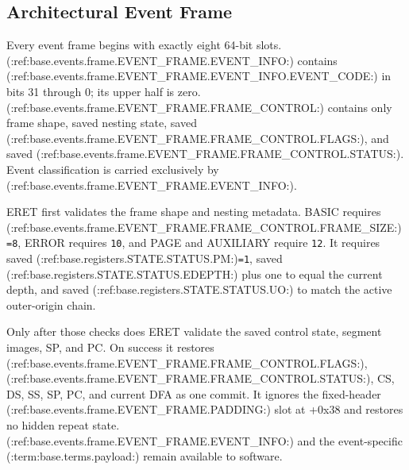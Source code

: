 \subsection{Architectural Event Frame}
Every event frame begins with exactly eight 64-bit slots. (:ref:base.events.frame.EVENT_FRAME.EVENT_INFO:) contains (:ref:base.events.frame.EVENT_FRAME.EVENT_INFO.EVENT_CODE:) in bits 31 through 0;
its upper half is zero. (:ref:base.events.frame.EVENT_FRAME.FRAME_CONTROL:) contains only frame shape, saved nesting state, saved (:ref:base.events.frame.EVENT_FRAME.FRAME_CONTROL.FLAGS:), and saved (:ref:base.events.frame.EVENT_FRAME.FRAME_CONTROL.STATUS:).
Event classification is carried exclusively by (:ref:base.events.frame.EVENT_FRAME.EVENT_INFO:).









ERET first validates the frame shape and nesting metadata. BASIC requires (:ref:base.events.frame.EVENT_FRAME.FRAME_CONTROL.FRAME_SIZE:)\texttt{=8}, ERROR requires \texttt{10}, and
PAGE and AUXILIARY require \texttt{12}. It requires saved (:ref:base.registers.STATE.STATUS.PM:)\texttt{=1}, saved (:ref:base.registers.STATE.STATUS.EDEPTH:) plus one to equal the
current depth, and saved (:ref:base.registers.STATE.STATUS.UO:) to match the active outer-origin chain.

Only after those checks does ERET validate the saved control state, segment images, SP, and PC.
On success it restores (:ref:base.events.frame.EVENT_FRAME.FRAME_CONTROL.FLAGS:), (:ref:base.events.frame.EVENT_FRAME.FRAME_CONTROL.STATUS:), CS, DS, SS, SP, PC, and current DFA as one commit. It ignores the
fixed-header (:ref:base.events.frame.EVENT_FRAME.PADDING:) slot at +0x38 and restores no hidden repeat state. (:ref:base.events.frame.EVENT_FRAME.EVENT_INFO:) and the event-specific (:term:base.terms.payload:)
remain available to software.
